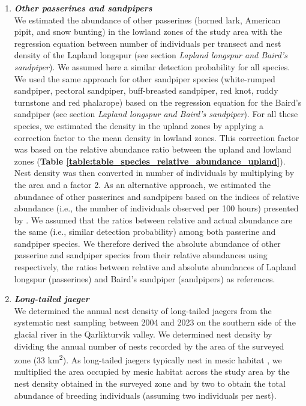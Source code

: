 \documentclass[a4paper,twoside,12pt]{article}
\begin{document}
\begin{enumerate}[label=\alph*.]
                \item[] \textit{\textbf{Other passerines and sandpipers}}\\
                We estimated the abundance of other passerines (horned lark, American pipit, and snow bunting) in the lowland zones of the study area with the regression equation between number of individuals per transect and nest density of the Lapland longspur (see section \textit{Lapland longspur and Baird’s sandpiper}). We assumed here a similar detection probability for all species. We used the same approach for other sandpiper species (white-rumped sandpiper, pectoral sandpiper, buff-breasted sandpiper, red knot, ruddy turnstone and red phalarope) based on the regression equation for the Baird's sandpiper (see section \textit{Lapland longspur and Baird’s sandpiper}). For all these species, we estimated the density in the upland zones by applying a correction factor to the mean density in lowland zones. This correction factor was based on the relative abundance ratio between the upland and lowland zones (\textbf{Table \ref{table:table_species_relative_abundance_upland}}). Nest density was then converted in number of individuals by multiplying by the area and a factor 2.
As an alternative approach, we estimated the abundance of other passerines and sandpipers based on the indices of relative abundance (i.e., the number of individuals observed per 100 hours) presented by \citet{gauthier2024a}. We assumed that the ratios between relative and actual abundance are the same (i.e., similar detection probability) among both passerine and sandpiper species. We therefore derived the absolute abundance of other passerine and sandpiper species from their relative abundances using respectively, the ratios between relative and absolute abundances of Lapland longspur (passerines) and Baird’s sandpiper (sandpipers) as references.

                \item[] \textit{\textbf{Long-tailed jaeger}}\\
                We determined the annual nest density of long-tailed jaegers from the systematic nest sampling between 2004 and 2023 on the southern side of the glacial river in the Qarlikturvik valley. We determined nest density by dividing the annual number of nests recorded by the area of the surveyed zone (33 km\textsuperscript{2}). As long-tailed jaegers typically nest in mesic habitat \citep{andersson1971}, we multiplied the area occupied by mesic habitat across the study area by the nest density obtained in the surveyed zone and by two to obtain the total abundance of breeding individuals (assuming two individuals per nest).
                

\end{enumerate}
\end{document}
